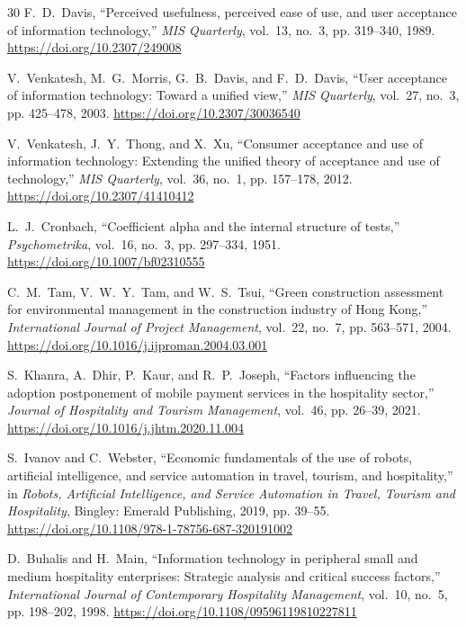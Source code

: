 \documentclass[11pt,a4paper]{article}
\begin{document}
\begin{thebibliography}{30}
F.~D.~Davis, ``Perceived usefulness, perceived ease of use, and user acceptance of information technology,'' \emph{MIS Quarterly}, vol.~13, no.~3, pp. 319--340, 1989. \url{https://doi.org/10.2307/249008}

V.~Venkatesh, M.~G.~Morris, G.~B.~Davis, and F.~D.~Davis, ``User acceptance of information technology: Toward a unified view,'' \emph{MIS Quarterly}, vol.~27, no.~3, pp. 425--478, 2003. \url{https://doi.org/10.2307/30036540}

V.~Venkatesh, J.~Y.~Thong, and X.~Xu, ``Consumer acceptance and use of information technology: Extending the unified theory of acceptance and use of technology,'' \emph{MIS Quarterly}, vol.~36, no.~1, pp. 157--178, 2012. \url{https://doi.org/10.2307/41410412}

L.~J.~Cronbach, ``Coefficient alpha and the internal structure of tests,'' \emph{Psychometrika}, vol.~16, no.~3, pp. 297--334, 1951. \url{https://doi.org/10.1007/bf02310555}

C.~M.~Tam, V.~W.~Y.~Tam, and W.~S.~Tsui, ``Green construction assessment for environmental management in the construction industry of Hong Kong,'' \emph{International Journal of Project Management}, vol.~22, no.~7, pp. 563--571, 2004. \url{https://doi.org/10.1016/j.ijproman.2004.03.001}

S.~Khanra, A.~Dhir, P.~Kaur, and R.~P.~Joseph, ``Factors influencing the adoption postponement of mobile payment services in the hospitality sector,'' \emph{Journal of Hospitality and Tourism Management}, vol.~46, pp. 26--39, 2021. \url{https://doi.org/10.1016/j.jhtm.2020.11.004}

S.~Ivanov and C.~Webster, ``Economic fundamentals of the use of robots, artificial intelligence, and service automation in travel, tourism, and hospitality,'' in \emph{Robots, Artificial Intelligence, and Service Automation in Travel, Tourism and Hospitality}, Bingley: Emerald Publishing, 2019, pp. 39--55. \url{https://doi.org/10.1108/978-1-78756-687-320191002}

D.~Buhalis and H.~Main, ``Information technology in peripheral small and medium hospitality enterprises: Strategic analysis and critical success factors,'' \emph{International Journal of Contemporary Hospitality Management}, vol.~10, no.~5, pp. 198--202, 1998. \url{https://doi.org/10.1108/09596119810227811}


\end{thebibliography}
\end{document}
